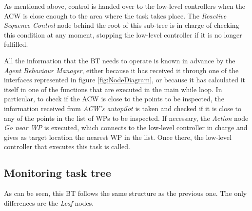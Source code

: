 As mentioned above, control is handed over to the low-level controllers when the \gls{ACW} is close enough to the area where the task takes place. The \emph{Reactive Sequence Control} node behind the root of this sub-tree is in charge of checking this condition at any moment, stopping the low-level controller if it is no longer fulfilled.

All the information that the BT needs to operate is known in advance by the \emph{Agent Behaviour Manager}, either because it has received it through one of the interfaces represented in figure \ref{fig:NodeDiagram}, or because it has calculated it itself in one of the functions that are executed in the main while loop. In particular, to check if the \gls{ACW} is close to the points to be inspected, the information received from \emph{\gls{ACW}'s autopilot} is taken and checked if it is close to any of the points in the list of \glspl{WP} to be inspected. If necessary, the \emph{Action} node \emph{Go near \gls{WP}} is executed, which connects to the low-level controller in charge and gives as target location the nearest \gls{WP} in the list. Once there, the low-level controller that executes this task is called.

\subsection{Monitoring task tree}
\label{sec:MonitoringTaskTree}
As can be seen, this \gls{BT} follows the same structure as the previous one. The only differences are the \emph{Leaf} nodes.

